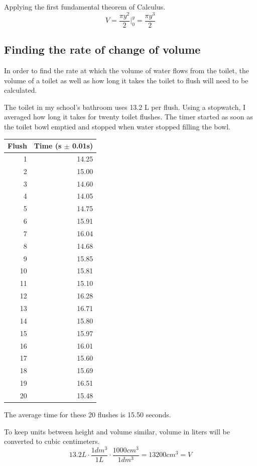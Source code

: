 \documentclass[12pt, titlepage]{article}
\begin{document}
Applying the first fundamental theorem of Calculus.
\begin{equation*}
    V = \frac{ \pi y^2 }{2} \biggr \rvert^y_0 = \frac{\pi y^3}{2}
\end{equation*}

\subsection{Finding the rate of change of volume}
In order to find the rate at which the volume of water flows from the toilet, the volume of a toilet as well as how long it takes the toilet to flush will need to be calculated. 

\pagebreak
The toilet in my school's bathroom uses 13.2 L per flush. Using a stopwatch, I averaged how long it takes for twenty toilet flushes. The timer started as soon as the toilet bowl emptied and stopped when water stopped filling the bowl.

\begin{center}
\begin{tabular}{rr}
Flush & Time (s \(\pm\) 0.01s)\\
\hline
1 & 14.25\\
2 & 15.00\\
3 & 14.60\\
4 & 14.05\\
5 & 14.75\\
6 & 15.91\\
7 & 16.04\\
8 & 14.68\\
9 & 15.85\\
10 & 15.81\\
11 & 15.10\\
12 & 16.28\\
13 & 16.71\\
14 & 15.80\\
15 & 15.97\\
16 & 16.01\\
17 & 15.60\\
18 & 15.69\\
19 & 16.51\\
20 & 15.48\\
\end{tabular}
\end{center}

The average time for these 20 flushes is 15.50 seconds. 

To keep units between height and volume similar, volume in liters will be converted to cubic centimeters.
\begin{equation*}
  13.2 L \cdot \frac{1 dm^{3}}{1 L} \cdot \frac{1000 cm^{3}}{1 dm^{3}} = 13200 cm^{3} = V
\end{equation*}
\end{document}
